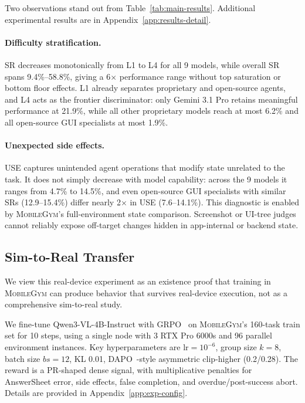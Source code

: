 \documentclass[11pt]{article}
\newcommand{\sys}{\textsc{MobileGym}}
\begin{document}
Two observations stand out from Table~\ref{tab:main-results}. Additional experimental results are in Appendix~\ref{app:results-detail}.

\paragraph{Difficulty stratification.} SR decreases monotonically from L1 to L4 for all 9 models, while overall SR spans 9.4\%--58.8\%, giving a 6$\times$ performance range without top saturation or bottom floor effects. L1 already separates proprietary and open-source agents, and L4 acts as the frontier discriminator: only Gemini 3.1 Pro retains meaningful performance at 21.9\%, while all other proprietary models reach at most 6.2\% and all open-source GUI specialists at most 1.9\%.

\paragraph{Unexpected side effects.} USE captures unintended agent operations that modify state unrelated to the task. It does not simply decrease with model capability: across the 9 models it ranges from 4.7\% to 14.5\%, and even open-source GUI specialists with similar SRs (12.9--15.4\%) differ nearly 2$\times$ in USE (7.6--14.1\%). This diagnostic is enabled by \sys{}'s full-environment state comparison. Screenshot or UI-tree judges cannot reliably expose off-target changes hidden in app-internal or backend state.

\subsection{Sim-to-Real Transfer}\label{sec:exp:sim2real}

We view this real-device experiment as an existence proof that
training in \sys{} can produce behavior that survives real-device
execution, not as a comprehensive sim-to-real study.

We fine-tune Qwen3-VL-4B-Instruct with GRPO~\cite{GRPO} on \sys{}'s 160-task train set for 10 steps, using a single node with 3 RTX Pro 6000s and 96 parallel environment instances. Key hyperparameters are $\mathrm{lr}=10^{-6}$, group size $k{=}8$, batch size $bs{=}12$, KL 0.01, DAPO~\cite{DAPO}-style asymmetric clip-higher (0.2/0.28). The reward is a PR-shaped dense signal, with multiplicative penalties for AnswerSheet error, side effects, false completion, and overdue/post-success abort. Details are provided in Appendix~\ref{app:exp-config}.
\end{document}
